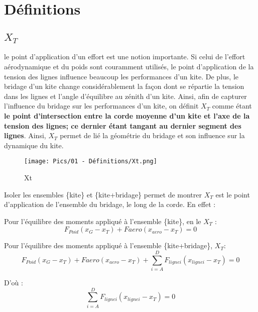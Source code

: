 \chapter{Définitions}
\label{ch:Ch1}

\section{\textbf{$X_{T}$}}
\label{sec:Ch1.1} 

le point d'application d'un effort est une notion importante. Si celui de l'effort aérodynamique et du poids sont couramment utilisés, le point d'application de la tension des lignes influence beaucoup les performances d'un kite. De plus, le bridage d'un kite change considérablement la façon dont se répartie la tension dans les lignes et l'angle d'équilibre au zénith d'un kite. Ainsi, afin de capturer l'influence du bridage sur les performances d'un kite, on définit $X_T$ comme étant \textbf{le point d'intersection entre la corde moyenne d'un kite et l'axe de la tension des lignes; ce dernier étant tangant au dernier segment des lignes}. Ainsi, $X_T$ permet de lié la géométrie du bridage et son influence sur la dynamique du kite.  \\

\begin{figure}[H]
    \centering
    \texttt{[image: Pics/01 - Définitions/Xt.png]}  
    \caption{Xt}
    \label{fig:Xt}
\end{figure}

Isoler les ensembles \{kite\} et \{kite+bridage\} permet de montrer $X_T$ est le point d'application de l'ensemble du bridage, le long de la corde. En effet :

Pour l'équilibre des moments appliqué à l'ensemble \{kite\}, en le $X_T$ :
\begin{equation}
    F_{Poid}(x_G-x_T)+F{aero}(x_{aero}-x_T) = 0
\end{equation}

Pour l'équilibre des moments appliqué à l'ensemble \{kite+bridage\}, $X_T$:
\begin{equation}
    F_{Poid}(x_G-x_T) + F{aero}(x_{aero}-x_T) + \sum_{i=A}^{D} F_{ligne i}(x_{ligne i}-x_T)= 0
\end{equation}

D'où : 
\begin{equation}
    \sum_{i=A}^{D} F_{ligne i}(x_{ligne i}-x_T)= 0
\end{equation}


